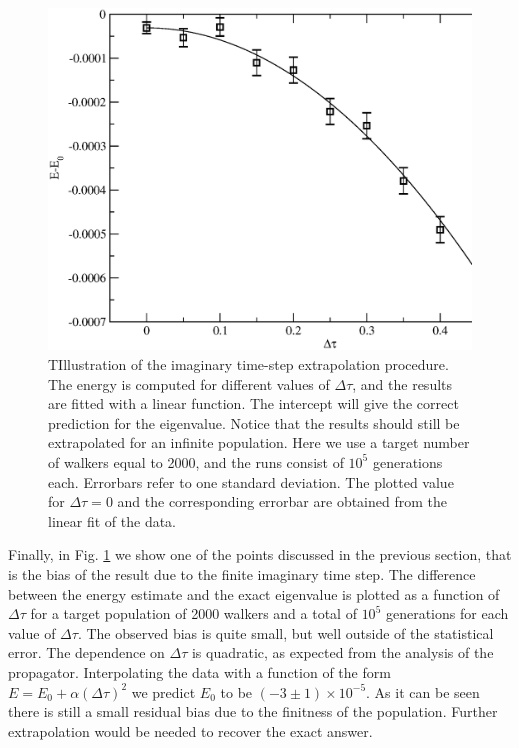 \begin{figure}
	\begin{center}
		\includegraphics[scale=0.5]{Chapter9-figures/dmc_extr.eps}
	\end{center}
	\caption{TIllustration of the imaginary time-step extrapolation procedure. The energy is computed for different values of $\Delta\tau$, and the results are fitted with a linear function. The intercept will give the correct prediction for the eigenvalue. Notice that the results should still be extrapolated for an infinite population. Here we use a target number of walkers equal to 2000, and the runs consist of $10^5$ generations each. Errorbars refer to one standard deviation. The plotted value for $\Delta\tau=0$ and the corresponding errorbar are obtained from the linear fit of the data. }
	\label{fig.extr}
\end{figure}

Finally, in Fig. \ref{fig.extr} we show one of the points discussed in the previous section, that is the bias of the result due to the finite imaginary time step. The difference between the energy estimate and the exact eigenvalue is plotted as a function of $\Delta\tau$ for a target population of 2000 walkers and a total of $10^5$ generations for each value of $\Delta\tau$. The observed bias is quite small, but well outside of the statistical error. The dependence on $\Delta\tau$ is quadratic, as expected from the analysis of the propagator. Interpolating the data with a function of the form $E=E_0+\alpha(\Delta\tau)^2$ we predict $E_0$ to be  $(-3\pm1)\times 10^{-5}$. As it can be seen there is still a small residual bias due to the finitness of the population. Further extrapolation would be needed to recover the exact answer. 
 

